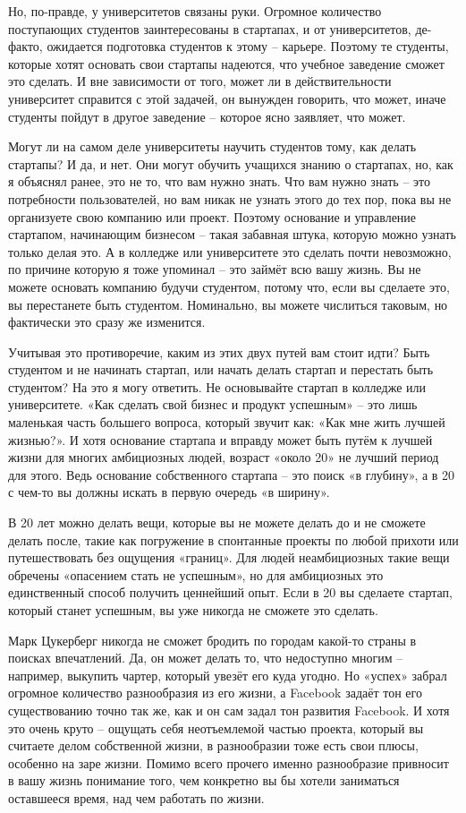\documentclass[ebook,12pt,oneside,openany]{memoir}
\begin{document}
Но, по-правде, у университетов связаны руки. Огромное количество
поступающих студентов заинтересованы в стартапах, и от университетов,
де-факто, ожидается подготовка студентов к этому – карьере. Поэтому те
студенты, которые хотят основать свои стартапы надеются, что учебное
заведение сможет это сделать. И вне зависимости от того, может ли в
действительности университет справится с этой задачей, он вынужден
говорить, что может, иначе студенты пойдут в другое заведение –
которое ясно заявляет, что может.

Могут ли на самом деле университеты научить студентов тому, как делать
стартапы? И да, и нет. Они могут обучить учащихся знанию о стартапах,
но, как я объяснял ранее, это не то, что вам нужно знать. Что вам
нужно знать – это потребности пользователей, но вам никак не узнать
этого до тех пор, пока вы не организуете свою компанию или проект.
Поэтому основание и управление стартапом, начинающим бизнесом – такая
забавная штука, которую можно узнать только делая это. А в колледже
или университете это сделать почти невозможно, по причине которую я
тоже упоминал – это займёт всю вашу жизнь. Вы не можете основать
компанию будучи студентом, потому что, если вы сделаете это, вы
перестанете быть студентом. Номинально, вы можете числиться таковым,
но фактически это сразу же изменится.

Учитывая это противоречие, каким из этих двух путей вам стоит идти?
Быть студентом и не начинать стартап, или начать делать стартап и
перестать быть студентом? На это я могу ответить. Не основывайте
стартап в колледже или университете. «Как сделать свой бизнес и
продукт успешным» – это лишь маленькая часть большего вопроса, который
звучит как: «Как мне жить лучшей жизнью?». И хотя основание стартапа и
вправду может быть путём к лучшей жизни для многих амбициозных людей,
возраст «около 20» не лучший период для этого. Ведь основание
собственного стартапа – это поиск «в глубину», а в 20 с чем-то вы
должны искать в первую очередь «в ширину».

В 20 лет можно делать вещи, которые вы не можете делать до и не
сможете делать после, такие как погружение в спонтанные проекты по
любой прихоти или путешествовать без ощущения «границ». Для людей
неамбициозных такие вещи обречены «опасением стать не успешным», но
для амбициозных это единственный способ получить ценнейший опыт. Если
в 20 вы сделаете стартап, который станет успешным, вы уже никогда не
сможете это сделать.

Марк Цукерберг никогда не сможет бродить по городам какой-то страны в
поисках впечатлений. Да, он может делать то, что недоступно многим –
например, выкупить чартер, который увезёт его куда угодно. Но «успех»
забрал огромное количество разнообразия из его жизни, а Facebook
задаёт тон его существованию точно так же, как и он сам задал тон
развития Facebook. И хотя это очень круто – ощущать себя неотъемлемой
частью проекта, который вы считаете делом собственной жизни, в
разнообразии тоже есть свои плюсы, особенно на заре жизни. Помимо
всего прочего именно разнообразие привносит в вашу жизнь понимание
того, чем конкретно вы бы хотели заниматься оставшееся время, над чем
работать по жизни.
\end{document}
